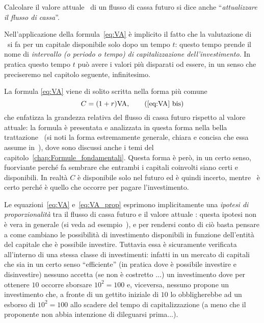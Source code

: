 \begin{oss}
  Calcolare il valore attuale \VA\ di un flusso di cassa futuro si dice anche ``\emph{attualizzare il flusso di cassa}''.
\end{oss}
\begin{oss}
  Nell'applicazione della formula~\eqref{eq:VA} è implicito il fatto che la valutazione di \VA\ si fa per un capitale
  disponibile solo dopo un tempo $t$: questo tempo prende il nome di \emph{intervallo (o periodo o tempo) di capitalizzazione
    dell'investimento}. In pratica questo tempo $t$ può avere i valori più disparati od essere, in un senso che preciseremo
  nel capitolo seguente, infinitesimo.
\end{oss}
\begin{oss}
  La formula \eqref{eq:VA} viene di solito scritta nella forma più comune 
  \begin{equation}
    \label{eq:VA_prop}
    C=(1+r)\VA,\tag{\ref*{eq:VA} bis}
  \end{equation}
  che enfatizza la grandezza relativa del flusso di cassa futuro rispetto al valore attuale: la formula è presentata e analizzata
  in questa forma nella bella trattazione~\cite{Levi1957} (si noti la forma estremamente generale, chiara e concisa che essa assume
  in~\cite[§1, p. 151]{Levi1957}), dove sono discussi anche i temi del capitolo~\ref{chap:Formule_fondamentali}.
  Questa forma è però, in un certo senso, fuorviante perché fa sembrare che entrambi i capitali coinvolti siano certi e disponibili.
  In realtà $C$ è disponibile solo nel futuro ed è quindi incerto, mentre \VA\ è certo perché è quello che occorre per pagare
  l'investimento.
\end{oss}

\begin{oss}
  Le equazioni~\eqref{eq:VA} e~\eqref{eq:VA_prop} esprimono implicitamente una \emph{ipotesi di proporzionalità} tra il flusso di cassa
  futuro e il valore attuale \VA: questa ipotesi non è vera in generale (si veda ad esempio~\cite[§9, p. 158]{Levi1957}), e per rendersi
  conto di ciò basta pensare a come cambiano le possibilità di investimento disponibili in funzione dell'entità del capitale che è possibile
  investire. Tuttavia essa è sicuramente verificata all'interno di una stessa classe di investimenti: infatti in un mercato di capitali che
  sia in un certo senso ``efficiente'' (in pratica dove è possibile investire e disinvestire) nessuno accetta (se non è costretto
  ...) un investimento dove per ottenere $10$ occorre sborsare $10^2=100$ e, viceversa, nessuno propone un investimento che, a fronte
  di un gettito iniziale di $10$ lo obbligherebbe ad un esborso di $10^2=100$ allo scadere del tempo di capitalizzazione (a meno che
  il proponente non abbia intenzione di dileguarsi prima...).
\end{oss}

